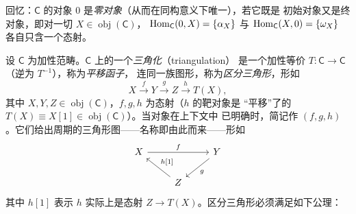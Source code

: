 回忆：$\mathsf C$ 的对象 $0$ 是\emph{零对象}（从而在同构意义下唯一），若它既是
初始对象又是终对象，即对一切 $X\in\operatorname{obj}(\mathsf C)$，
$\operatorname{Hom}_{\mathsf C}(0,X)=\{\alpha_X\}$ 与 $\operatorname{Hom}_{\mathsf C}(X,0)=\{\omega_X\}$
各自只含一个态射。

\begin{Def}\label{def:3.2}
设 $\mathsf C$ 为加性范畴。$\mathsf C$ 上的一个\emph{三角化}（triangulation）
是一个加性等价 $T:\mathsf C\to\mathsf C$（逆为 $T^{-1}$），称为\emph{平移函子}，
连同一族图形，称为\emph{区分三角形}，形如
\[
  X\xrightarrow{f}Y\xrightarrow{g}Z\xrightarrow{h}T(X),
\]
其中 $X,Y,Z\in\operatorname{obj}(\mathsf C)$，$f,g,h$ 为态射（$h$ 的靶对象是
“平移”了的 $T(X)\equiv X[1]\in\operatorname{obj}(\mathsf C)$）。当对象在上下文中
已明确时，简记作 $(f,g,h)$。它们给出周期的三角形图——名称即由此而来——形如
\[
  \begin{tikzcd}
    X \arrow[rr, "{f}"] & & Y \arrow[dl, "{g}"] \\
    & Z \arrow[ul, "{h{[}1{]}}"'] &
  \end{tikzcd}
\]
其中 $h[1]$ 表示 $h$ 实际上是态射 $Z\to T(X)$。区分三角形必须满足如下公理：


\end{Def}
